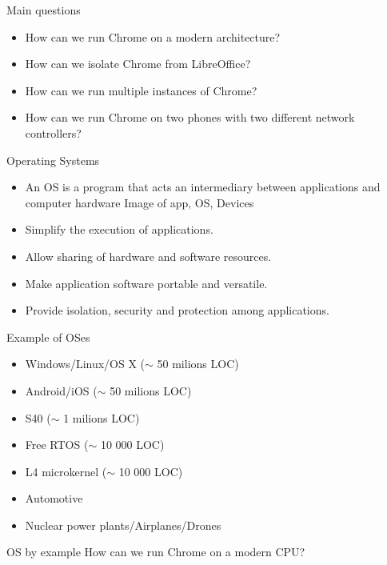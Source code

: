 \documentclass{beamer}
\begin{document}
\begin{frame}{Main questions}
  \begin{itemize}
    \item How can we run Chrome on a modern architecture?
    \item How can we isolate Chrome from LibreOffice?
    \item How can we run multiple instances of Chrome?
    \item How can we run Chrome on two phones with
      two different network controllers?
  \end{itemize}
\end{frame}

\begin{frame}{Operating Systems}
  \begin{itemize}
  \item An OS is a program that acts an intermediary
    between applications and computer hardware
\alert{Image of app, OS, Devices}
  \item Simplify the execution of applications.
  \item Allow sharing of hardware and software resources.
  \item Make application software portable and versatile.
  \item Provide isolation, security and protection among
    applications.
  \end{itemize}
\end{frame}

\begin{frame}{Example of OSes}
  \begin{itemize}
  \item Windows/Linux/OS X ($\sim$ 50 milions LOC)
  \item<2-> Android/iOS ($\sim$ 50 milions LOC)
  \item<3-> S40 ($\sim$ 1 milions LOC)
  \item<4-> Free RTOS ($\sim$ 10 000 LOC)
  \item<5-> L4 microkernel ($\sim$ 10 000 LOC)
  \item<6-> Automotive
  \item<7-> Nuclear power plants/Airplanes/Drones
  \end{itemize}
\end{frame}

\begin{frame}{OS by example}
  How can we run Chrome on a modern CPU?
\end{frame}
\end{document}
